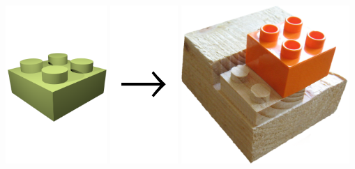 \documentclass[t]{beamer}
\begin{document}
\begin{frame}
\begin{center}
    \includegraphics[height=6cm]{../img/fraese-lego-3d.png}
    \includegraphics[height=6cm]{../img/pfeil.pdf}
    \includegraphics[height=6cm]{../img/fraese-lego.png}

    \end{center}
\end{frame}
\end{document}
